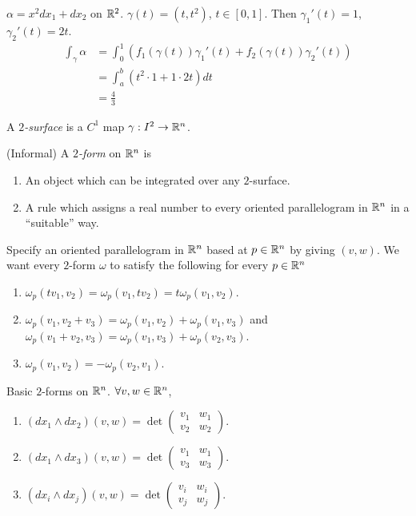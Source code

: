 \documentclass[11pt]{article}
\begin{document}
\begin{example} $\alpha = x^2dx_1 + dx_2$ on $\mathbb{R}^2$. $\gamma(t) = (t, t^2)$, $t \in [0, 1]$. Then $\gamma_1' (t) = 1$, $\gamma_2'(t) = 2t$. \begin{align*} \int_{\gamma} \alpha & = \int_0^1 (f_1(\gamma(t)) \gamma_1' (t) + f_2 (\gamma(t)) \gamma_2'(t)) \\ & =\int_a^b (t^2 \cdot 1 +1  \cdot 2t) dt \\ & = \frac{4}{3} \end{align*}
\end{example}

\begin{definition} A \emph{$2$-surface} is a $C^1$ map $\gamma : I^2 \to \mathbb{R}^n$.
\end{definition}

\begin{definition} (Informal) A \emph{$2$-form} on $\mathbb{R}^n$ is
  \begin{enumerate}
  \item An object which can be integrated over any $2$-surface.
  \item A rule which assigns a real number to every oriented parallelogram in $\mathbb{R}^n$ in a ``suitable'' way.
  \end{enumerate}
\end{definition}

Specify an oriented parallelogram in $\mathbb{R}^n$ based at $p \in \mathbb{R}^n$ by giving $(v, w)$. We want every $2$-form $\omega$ to satisfy the following for every $p \in \mathbb{R}^n$
\begin{enumerate}
\item $\omega_p(tv_1, v_2) = \omega_p(v_1, tv_2) = t \omega_p(v_1, v_2)$.
\item $\omega_p(v_1, v_2 + v_3) = \omega_p (v_1, v_2) + \omega_p(v_1, v_3)$ and $\omega_p(v_1 + v_2, v_3) = \omega_p(v_1, v_3) + \omega_p(v_2, v_3)$.
\item $\omega_p(v_1, v_2) = - \omega_p(v_2, v_1)$.
\end{enumerate}

Basic $2$-forms on $\mathbb{R}^n$. $\forall v, w \in \mathbb{R}^n$,
\begin{enumerate}
\item $(dx_1 \wedge dx_2)(v, w) = \det \begin{pmatrix} v_1 & w_1 \\ v_2 & w_2 \end{pmatrix}$.
\item $(dx_1 \wedge dx_3)(v, w) = \det \begin{pmatrix} v_1 & w_1 \\ v_3 & w_3 \end{pmatrix}$.
\item $(dx_i \wedge dx_j)(v, w) = \det \begin{pmatrix} v_i & w_i \\ v_j & w_j \end{pmatrix}$.
\end{enumerate}
\end{document}
